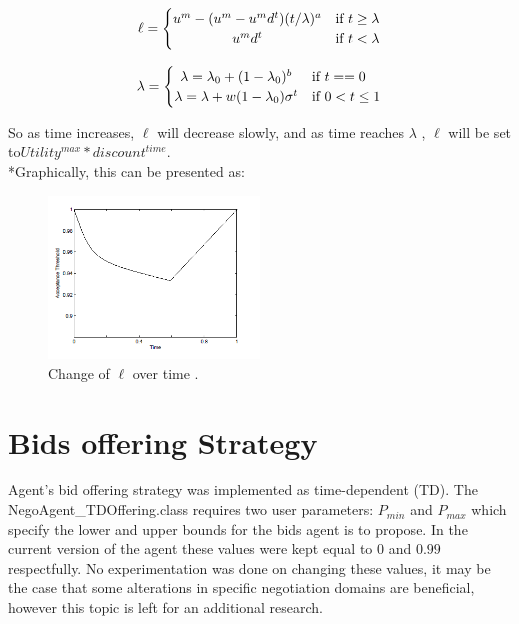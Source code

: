 \documentclass[html]{report}    %
\begin{document}
\[
  \ell = \left\{\def\arraystretch{1.2}%
  \begin{array}{@{}c@{\quad}l@{}}
    u^m -(u^m-	u^md^t)(t/\lambda)^a  & \mbox{if } t \geq \lambda \\
   	u^m d^t & \mbox{if } t < \lambda
  \end{array}\right.
\]

\[
  \lambda = \left\{\def\arraystretch{1.2}%
  \begin{array}{@{}c@{\quad}l@{}}
    \lambda = \lambda_0 + (1-\lambda_0)^b &  \mbox{if } t==0\\
    \lambda = \lambda + w(1-\lambda_0)\sigma^t & \mbox{if } 0<t\leq1\\
  \end{array}\right.
\]

So as time increases, $\ell$ will decrease slowly, and as time reaches $\lambda$ , $\ell$ will be set to\( Utility^{max} * discount^{time}  \).
\\*Graphically, this can be presented as:


	\begin{figure}[h!]
	  \caption{Change of $\ell$ over time .}
	  \centering
	    \includegraphics[width=0.5\textwidth]{ell}
	\end{figure}

\section{Bids offering Strategy}

Agent's bid offering strategy was implemented as time-dependent (TD). The NegoAgent\_TDOffering.class requires two user parameters: $P_{min}$ and $P_{max}$ which specify the lower and upper bounds for the bids agent is to propose. In the current version of the agent these values were kept equal to $0$ and $0.99$ respectfully. No experimentation was done on changing these values, it may be the case that some alterations in specific negotiation domains are beneficial, however this topic is left for an additional research.
\end{document}
